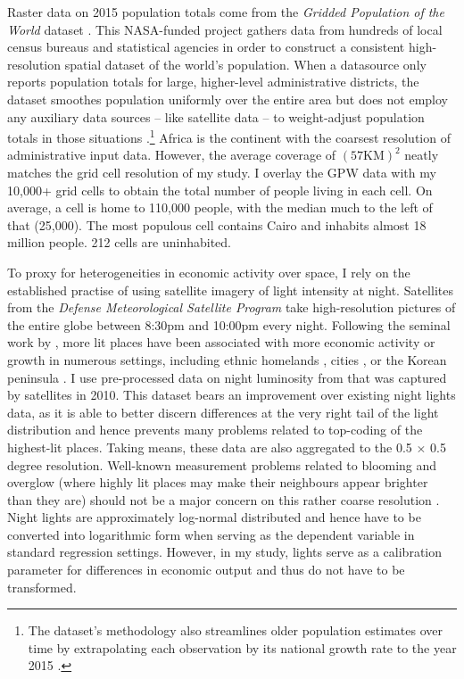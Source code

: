 \documentclass[11pt, oneside]{article}   	%
\begin{document}
Raster data on 2015 population totals come from the \textit{Gridded Population of the World} dataset \citep[GPW,][]{socioeconomic_data_and_applications_center_gridded_2016}. This NASA-funded project gathers data from hundreds of local census bureaus and statistical agencies in order to construct a consistent high-resolution spatial dataset of the world's population. When a datasource only reports population totals for large, higher-level administrative districts, the dataset smoothes population uniformly over the entire area but does not employ any auxiliary data sources -- like satellite data -- to weight-adjust population totals in those situations \citep{Doxsey-Whitfield_TakingAdvantageImproved_2015}.\footnote{The dataset's methodology also streamlines older population estimates over time by extrapolating each observation by its national growth rate to the year 2015 \citep{Doxsey-Whitfield_TakingAdvantageImproved_2015}.} Africa is the continent with the coarsest resolution of administrative input data. However, the average coverage of $(57\textrm{KM})^{2}$ neatly matches the grid cell resolution of my study. I overlay the GPW data with my 10,000+ grid cells to obtain the total number of people living in each cell. On average, a cell is home to 110,000 people, with the median much to the left of that (25,000). The most populous cell contains Cairo and inhabits almost 18 million people. 212 cells are uninhabited.

To proxy for heterogeneities in economic activity over space, I rely on the established practise of using satellite imagery of light intensity at night. Satellites from the \textit{Defense Meteorological Satellite Program} take high-resolution pictures of the entire globe between 8:30pm and 10:00pm every night. Following the seminal work by \cite{henderson_measuring_2012}, more lit places have been associated with more economic activity or growth in numerous settings, including ethnic homelands \citep{michalopoulos_national_2014}, cities \citep{storeygard_farther_2016,Kocornik-Mina_Floodedcities_2015}, or the Korean peninsula \citep{Lee_InternationalIsolationRegional_2016}. I use pre-processed data on night luminosity from \cite{henderson_global_2018} that was captured by satellites in 2010. This dataset bears an improvement over existing night lights data, as it is able to better discern differences at the very right tail of the light distribution and hence prevents many problems related to top-coding of the highest-lit places. Taking means, these data are also aggregated to the 0.5 $\times$ 0.5 degree resolution. Well-known measurement problems related to blooming and overglow (where highly lit places may make their neighbours appear brighter than they are) should not be a major concern on this rather coarse resolution \citep{Michalopoulos_SpatialPatternsDevelopment_2018}. Night lights are approximately log-normal distributed and hence have to be converted into logarithmic form when serving as the dependent variable in standard regression settings. However, in my study, lights serve as a calibration parameter for differences in economic output and thus do not have to be transformed.
\end{document}
